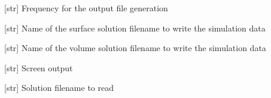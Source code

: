 \documentclass[letterpaper,10pt,english]{sphinxmanual}
\begin{document}
\begin{fulllineitems}
\begin{fulllineitems}
\label{\detokenize{modules:su2.Solver_Input_Output.output_freq}}
\pysigstartsignatures
{}
\pysigstopsignatures
\sphinxAtStartPar
{[}str{]} Frequency for the output file generation

\end{fulllineitems}


\begin{fulllineitems}
\label{\detokenize{modules:su2.Solver_Input_Output.output_surf}}
\pysigstartsignatures
{}
\pysigstopsignatures
\sphinxAtStartPar
{[}str{]} Name of the surface solution filename to write the simulation data

\end{fulllineitems}


\begin{fulllineitems}
\label{\detokenize{modules:su2.Solver_Input_Output.output_vol}}
\pysigstartsignatures
{}
\pysigstopsignatures
\sphinxAtStartPar
{[}str{]} Name of the volume solution filename to write the simulation data

\end{fulllineitems}


\begin{fulllineitems}
\label{\detokenize{modules:su2.Solver_Input_Output.screen}}
\pysigstartsignatures
{}
\pysigstopsignatures
\sphinxAtStartPar
{[}str{]} Screen output

\end{fulllineitems}


\begin{fulllineitems}
\label{\detokenize{modules:su2.Solver_Input_Output.solution_input}}
\pysigstartsignatures
{}
\pysigstopsignatures
\sphinxAtStartPar
{[}str{]} Solution filename to read


\end{fulllineitems}
\end{fulllineitems}
\end{document}
